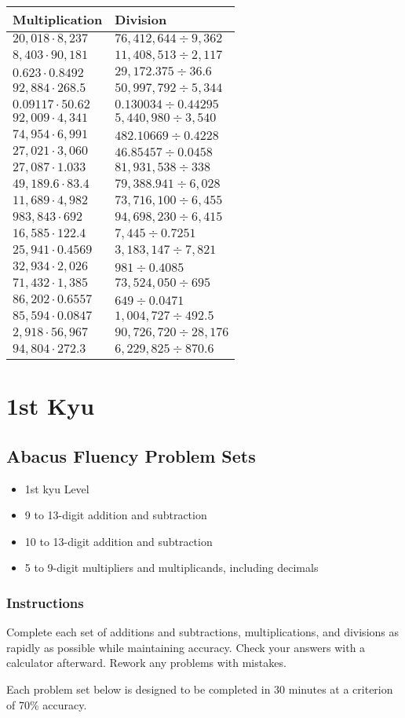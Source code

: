 \begin{longtable}[]{@{}ll@{}}
\toprule
Multiplication & Division\tabularnewline
\midrule
\endhead
\(20,018\cdot8,237\) & \(76,412,644÷9,362\)\tabularnewline
\(8,403\cdot90,181\) & \(11,408,513÷2,117\)\tabularnewline
\(0.623\cdot0.8492\) & \(29,172.375÷36.6\)\tabularnewline
\(92,884\cdot268.5\) & \(50,997,792÷5,344\)\tabularnewline
\(0.09117\cdot50.62\) & \(0.130034÷0.44295\)\tabularnewline
\(92,009\cdot4,341\) & \(5,440,980÷3,540\)\tabularnewline
\(74,954\cdot6,991\) & \(482.10669 ÷0.4228\)\tabularnewline
\(27,021\cdot3,060\) & \(46.85457÷0.0458\)\tabularnewline
\(27,087\cdot1.033\) & \(81,931,538÷338\)\tabularnewline
\(49,189.6\cdot83.4\) & \(79,388.941÷6,028\)\tabularnewline
\(11,689\cdot4,982\) & \(73,716,100÷6,455\)\tabularnewline
\(983,843\cdot692\) & \(94,698,230÷6,415\)\tabularnewline
\(16,585\cdot122.4\) & \(7,445÷0.7251\)\tabularnewline
\(25,941\cdot0.4569\) & \(3,183,147÷7,821\)\tabularnewline
\(32,934\cdot2,026\) & \(981÷0.4085\)\tabularnewline
\(71,432\cdot1,385\) & \(73,524,050÷695\)\tabularnewline
\(86,202\cdot0.6557\) & \(649÷0.0471\)\tabularnewline
\(85,594\cdot0.0847\) & \(1,004,727÷492.5\)\tabularnewline
\(2,918\cdot56,967\) & \(90,726,720÷28,176\)\tabularnewline
\(94,804\cdot272.3\) & \(6,229,825÷870.6\)\tabularnewline
\bottomrule
\end{longtable}

\hypertarget{st-kyu}{%
\section{1st Kyu}\label{st-kyu}}

\hypertarget{abacus-fluency-problem-sets}{%
\subsection{Abacus Fluency Problem
Sets}\label{abacus-fluency-problem-sets}}

\begin{itemize}
\item
  1st kyu Level
\item
  9 to 13-digit addition and subtraction
\item
  10 to 13-digit addition and subtraction
\item
  5 to 9-digit multipliers and multiplicands, including decimals
\end{itemize}

\hypertarget{instructions}{%
\subsubsection{Instructions}\label{instructions}}

Complete each set of additions and subtractions, multiplications, and
divisions as rapidly as possible while maintaining accuracy. Check your
answers with a calculator afterward. Rework any problems with mistakes.

Each problem set below is designed to be completed in 30 minutes at a
criterion of 70\% accuracy.
